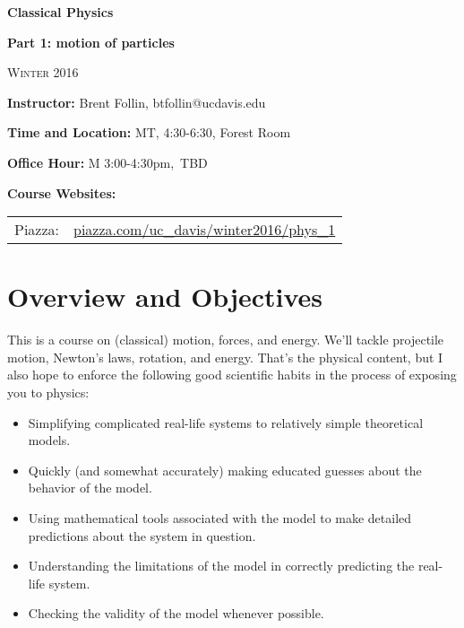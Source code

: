 \documentclass[12pt]{article}
\begin{document}
\thispagestyle{plain} %






\begin{center}
\bigskip
\large{\bf{Classical Physics}}

\textbf{Part 1: motion of particles}

\textsc{Winter 2016} \bigskip

\end{center}

\noindent\textbf{Instructor: }Brent Follin, btfollin@ucdavis.edu\medskip



\noindent\textbf{Time and Location:} MT, 4:30-6:30, Forest Room\medskip

\noindent\textbf{Office Hour:} M 3:00-4:30pm,\ TBD\medskip

\noindent\textbf{Course Websites:}
\begin{tabular}{l l}
Piazza: & \url{piazza.com/uc_davis/winter2016/phys_1} 
\end{tabular}
\bigskip



\section*{Overview and Objectives}
This is a course on (classical) motion, forces, and energy. We'll tackle projectile motion, Newton's laws, rotation, and energy. That's the physical content, but I also hope to enforce the following good scientific habits in the process of exposing you to physics:
\begin{itemize}
\item Simplifying complicated real-life systems to relatively simple theoretical models.
\item Quickly (and somewhat accurately) making educated guesses about the behavior of the model.
\item Using mathematical tools associated with the model to make detailed predictions about the system in question.
\item Understanding the limitations of the model in correctly predicting the real-life system.
\item Checking the validity of the model whenever possible.
\end{itemize}
\end{document}
